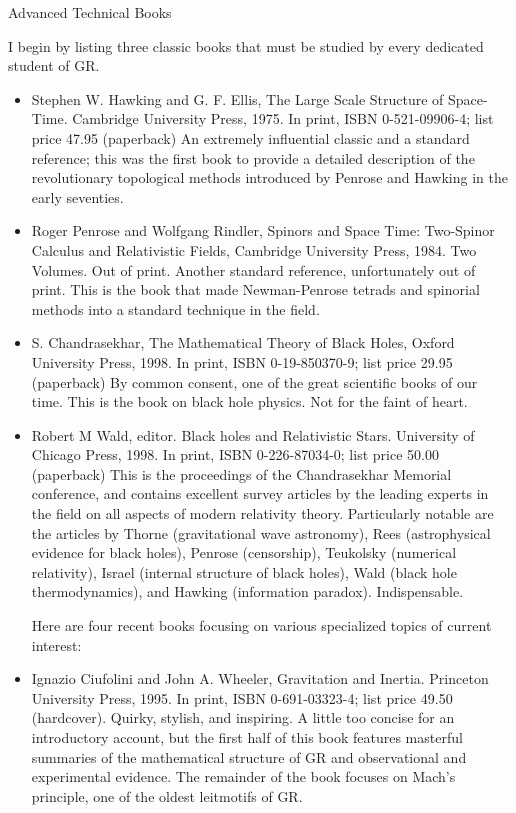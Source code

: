 \documentclass[10pt,a4paper]{book}
\theoremstyle{definition}
\begin{document}
Advanced Technical Books

I begin by listing three classic books that must be studied by every dedicated student of GR.

\begin{itemize}
\item Stephen W. Hawking and G. F. Ellis,
The Large Scale Structure of Space-Time.
Cambridge University Press, 1975.
In print, ISBN 0-521-09906-4; list price 47.95 (paperback)
An extremely influential classic and a standard reference; this was the first book to provide a detailed description of the revolutionary topological methods introduced by Penrose and Hawking in the early seventies.

\item Roger Penrose and Wolfgang Rindler,
Spinors and Space Time: Two-Spinor Calculus and Relativistic Fields,
Cambridge University Press, 1984.  Two Volumes.
Out of print.
Another standard reference, unfortunately out of print.  This is the book that made Newman-Penrose tetrads and spinorial methods into a standard technique in the field.

\item S. Chandrasekhar,
The Mathematical Theory of Black Holes,
Oxford University Press, 1998.
In print, ISBN 0-19-850370-9; list price 29.95 (paperback)
By common consent, one of the great scientific books of our time.  This is the book on black hole physics.  Not for the faint of heart.

\item Robert M Wald, editor.
Black holes and Relativistic Stars.
University of Chicago Press, 1998.
In print, ISBN 0-226-87034-0; list price 50.00 (paperback)
This is the proceedings of the Chandrasekhar Memorial conference, and contains excellent survey articles by the leading experts in the field on all aspects of modern relativity theory.  Particularly notable are the articles by Thorne (gravitational wave astronomy), Rees (astrophysical evidence for black holes), Penrose (censorship), Teukolsky (numerical relativity), Israel (internal structure of black holes), Wald (black hole thermodynamics), and Hawking (information paradox).  Indispensable.

Here are four recent books focusing on various specialized topics of current interest:

\item Ignazio Ciufolini and John A. Wheeler,
Gravitation and Inertia.
Princeton University Press, 1995.
In print, ISBN 0-691-03323-4; list price 49.50 (hardcover).
Quirky, stylish, and inspiring.  A little too concise for an introductory account, but the first half of this book features masterful summaries of the mathematical structure of GR and observational and experimental evidence.  The remainder of the book focuses on Mach's principle, one of the oldest leitmotifs of GR.


\end{itemize}
\end{document}
